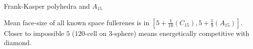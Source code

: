 \documentclass[%
pdf,
colorBG,
slideColor,
]{prosper}
\begin{document}
\begin{slide}{Frank-Kasper polyhedra and $A_{15}$}

\begin{center}
\begin{minipage}{5.5cm}
\begin{minipage}{25mm}
\centering
\epsfxsize=20mm
\par
\end{minipage}
\hfill\begin{minipage}{25mm}
\centering
\epsfxsize=25mm
\par
\end{minipage}
\begin{minipage}{25mm}
\centering
\epsfxsize=25mm
\par
\end{minipage}
\hfill\begin{minipage}{25mm}
\centering
\epsfxsize=25mm
\par
\end{minipage}
\end{minipage}
\begin{minipage}{5.5cm}
\centering
{}\par
\end{minipage}
\end{center}

Mean face-size of all known space fullerenes is in $[5 + \frac{1}{10} (C_{15}), 5 + \frac{1}{9} (A_{15})]$.
Closer to impossible $5$ ($120$-cell on $3$-sphere) means energetically competitive with diamond.

\end{slide}
\end{document}

